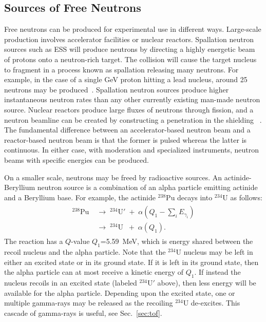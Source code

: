 \documentclass[main.tex]{subfiles}
\begin{document}
\subsection{Sources of Free Neutrons} \label{sec:freeNeutrons}
Free neutrons can be produced for experimental use in different ways. Large-scale production involves accelerator facilities or nuclear reactors. Spallation neutron sources such as ESS will produce neutrons by directing a highly energetic beam of protons onto a neutron-rich target. The collision will cause the target nucleus to fragment in a process known as spallation releasing many neutrons. 
For example, in the case of a single \si{\GeV} proton hitting a lead nucleus, around 25 neutrons may be produced~\cite{Tavernier}. Spallation neutron sources produce higher instantaneous neutron rates than any other currently existing man-made neutron source.
Nuclear reactors produce large fluxes of neutrons through fission, and a neutron beamline can be created by constructing a penetration in the shielding ~\cite{Krane}. The fundamental difference between an accelerator-based neutron beam and a reactor-based neutron beam is that the former is pulsed whereas the latter is continuous. In either case, with moderation and specialized instruments, neutron beams with specific energies can be produced.

On a smaller scale, neutrons may be freed by radioactive sources. An actinide-Beryllium neutron source is a combination of an alpha particle emitting actinide and a Beryllium base. For example, the actinide $^{238}$Pu decays into $^{234}$U as follows:
\begin{align}
	\begin{split}	
		^\textrm{238}\textrm{Pu}\;&\rightarrow\;^{\textrm{234}}\textrm{U}'\;+\;\alpha\left(Q_1-\textstyle\sum_i E_{\gamma_i}\right)\\
		&\rightarrow\;^{\textrm{234}}\textrm{U}\;\;+\;\alpha(Q_1).
	\label{eq:actinide}
	\end{split}
\end{align}
The reaction has a $Q$-value $Q_1$=\SI{5.59}{\MeV}, which is energy shared between the recoil nucleus and the alpha particle. Note that the $^\textrm{234}$U nucleus may be left in either an excited state or in its ground state. If it is left in its ground state, then the alpha particle can at most receive a kinetic energy of $Q_1$. If instead the nucleus recoils in an excited state (labeled $^\textrm{234}$U$'$ above), then less energy will be available for the alpha particle.
Depending upon the excited state, one or multiple gamma-rays may be released as the recoiling $^\textrm{234}$U de-excites. This cascade of gamma-rays is useful, see Sec.~\ref{sec:tof}.
\end{document}
